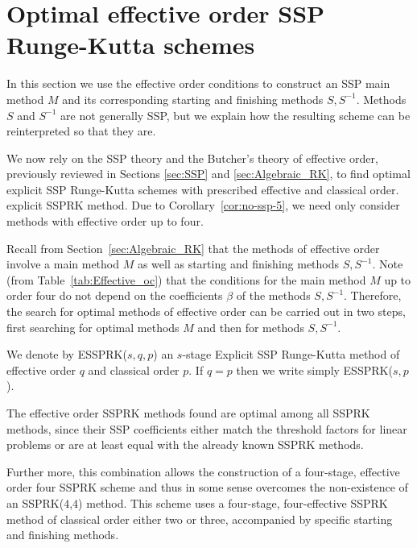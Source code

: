 \section{Optimal effective order SSP Runge-Kutta schemes}\label{sec:Optimal_ESSPRK}
In this section we use the effective order conditions to
construct an SSP main method $M$ and its corresponding starting and finishing
methods $S,S^{-1}$.  Methods $S$ and $S^{-1}$ are not generally SSP, but we
explain how the resulting scheme can be reinterpreted so that they are.

We now rely on the SSP theory and the Butcher's theory of effective order,
previously reviewed in Sections \ref{sec:SSP} and \ref{sec:Algebraic_RK}, to
find optimal explicit SSP Runge-Kutta schemes with prescribed effective and classical order.
explicit SSPRK method.  Due to Corollary~\ref{cor:no-ssp-5}, we need only consider
methods with effective order up to four.

Recall from Section~\ref{sec:Algebraic_RK} that the methods of effective order involve
a main method $M$ as well as starting and finishing methods $S,S^{-1}$.
Note (from Table~\ref{tab:Effective_oc}) that the conditions for the main method $M$
up to order four do not depend on the coefficients $\beta$ of the methods $S,S^{-1}$. 
Therefore, the search for optimal methods of effective order can be carried out in
two steps, first searching for optimal methods $M$ and then for methods $S,S^{-1}$.


We denote by ESSPRK($s,q,p$) an $s$-stage Explicit SSP Runge-Kutta method of
effective order $q$ and classical order $p$. If $q=p$ then we
write simply ESSPRK($s,p$). 

The effective order SSPRK methods found are optimal among all SSPRK methods, since their SSP coefficients either match the threshold factors for linear problems  or are at least equal with the already known SSPRK methods. 


Further more, this combination allows the construction of a
four-stage, effective order four SSPRK scheme and thus in some sense overcomes the
non-existence of an SSPRK(\( 4 \),\( 4 \)) method.  This scheme uses a
four-stage, four-effective SSPRK method of classical order either two
or three, accompanied by specific starting and finishing methods.


